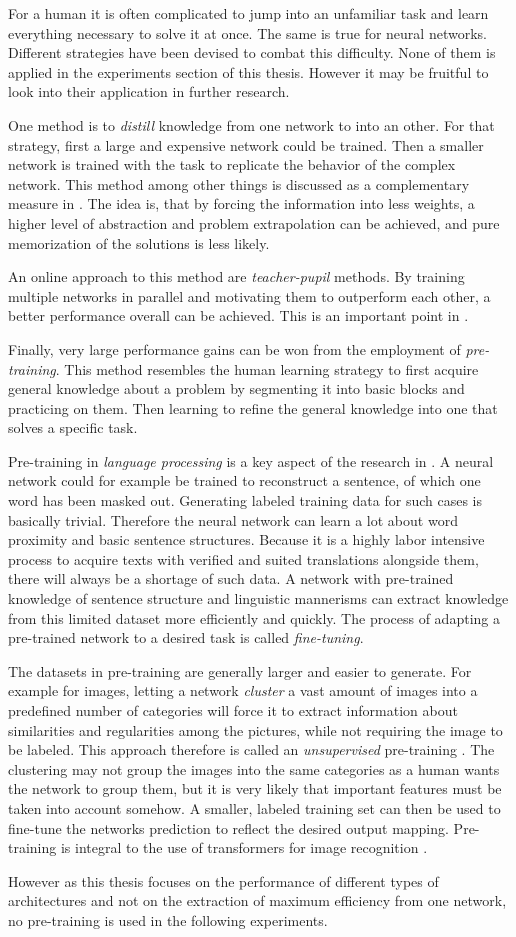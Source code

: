 For a human it is often complicated to jump into an unfamiliar task and learn everything necessary to solve it at once.
The same is true for neural networks. 
Different strategies have been devised to combat this difficulty. 
None of them is applied in the experiments section of this thesis. 
However it may be fruitful to look into their application in further research. 

One method is to \emph{distill} knowledge from one network to into an other. 
For that strategy, first a large and expensive network could be trained.
Then a smaller network is trained with the task to replicate the behavior of the complex network. 
This method among other things is discussed as a complementary measure in \cite{mobileNetPaper}.
The idea is, that by forcing the information into less weights, a higher level of abstraction and problem extrapolation can be achieved, and pure memorization of the solutions is less likely.

An \glqq online\grqq{} approach to this method are \emph{teacher-pupil} methods. 
By training multiple networks in parallel and motivating them to outperform each other, a better performance overall can be achieved. This is an important point in \cite{dinoPaper}.

Finally, very large performance gains can be won from the employment of \emph{pre-training}.
This method resembles the human learning strategy to first acquire general knowledge about a problem by segmenting it into basic blocks and practicing on them.
Then learning to refine the general knowledge into one that solves a specific task.

Pre-training in \emph{language processing} is a key aspect of the research in \cite{bertPaper}.
A neural network could for example be trained to reconstruct a sentence, of which one word has been masked out.
Generating labeled training data for such cases is basically trivial. 
Therefore the neural network can learn a lot about word proximity and basic sentence structures.
Because it is a highly labor intensive process to acquire texts with verified and suited translations alongside them, there will always be a shortage of such data.
A network with pre-trained knowledge of sentence structure and linguistic mannerisms can extract knowledge from this limited dataset more efficiently and quickly.
The process of adapting a pre-trained network to a desired task is called \emph{fine-tuning}.

The datasets in pre-training are generally larger and easier to generate. 
For example for images, letting a network \emph{cluster} a vast amount of images into a predefined number of categories will force it to extract information about similarities and regularities among the pictures, while not requiring the image to be labeled. This approach therefore is called an \emph{unsupervised} pre-training \cite{dinoPaper}. 
The clustering may not group the images into the same categories as a human wants the network to group them, but it is very likely that important features must be taken into account somehow. 
A smaller, labeled training set can then be used to fine-tune the networks prediction to reflect the desired output mapping. 
Pre-training is integral to the use of transformers for image recognition \cite{imageWorth16x16}. 

However as this thesis focuses on the performance of different types of architectures and not on the extraction of maximum efficiency from one network, no pre-training is used in the following experiments.
